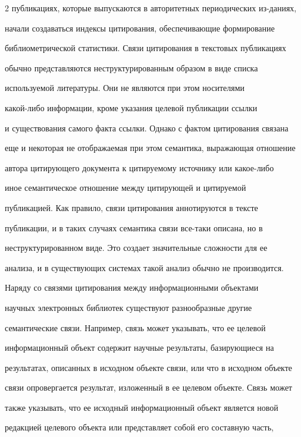 \begin{multicols}{2}
публикациях, которые выпускаются в авторитетных периодических из-\linebreak даниях, 


начали создаваться индексы цитирования, обеспечивающие формирование 


биб\-лио\-мет\-ри\-че\-ской статистики. Связи цитирования в текстовых публикациях 


обычно представляются неструктурированным образом в виде списка 


используемой литературы. Они не являются при этом носителями 


     ка\-кой-ли\-бо информации, кроме указания целевой публикации ссылки 


и существования самого факта ссылки. Однако с фактом цитирования связана 


еще и некоторая не отображаемая при этом семантика, выражающая отношение 


автора цитирующего документа к цитируемому источнику или ка\-кое-ли\-бо 


иное семантическое отношение между ци\-ти\-ру\-ющей и цитируемой 


публикацией. Как правило, связи цитирования аннотируются в тексте 


публикации, и в таких случаях семантика связи все-та\-ки описана, но в 


неструктурированном виде. Это создает значительные сложности для ее 


анализа, и в существующих системах такой анализ обычно не производится.


     


     Наряду со связями цитирования между информационными объектами 


научных электронных биб\-лио\-тек существуют разнообразные другие 


семантические связи. Например, связь может указывать, что ее целевой 


информационный объект содержит научные результаты, базирующиеся на 


результатах, описанных в исходном объекте связи, или что в исходном объекте 


связи опровергается результат, изложенный в ее целевом объекте. Связь может 


также указывать, что ее исходный информационный объект является новой 


редакцией целевого объекта или представляет собой его составную часть, 



\end{multicols}

